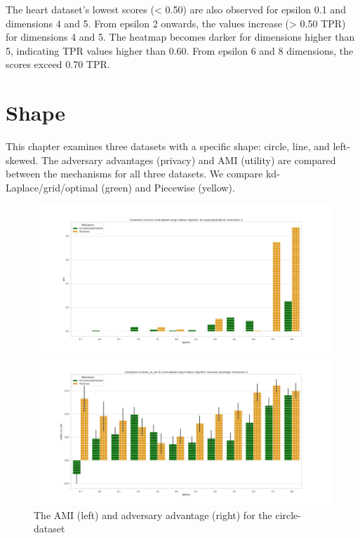 The heart dataset's lowest scores (< 0.50) are also observed for epsilon 0.1 and dimensions 4 and 5. From epsilon 2 onwards, the values increase (> 0.50 TPR) for dimensions 4 and 5. The heatmap becomes darker for dimensions higher than 5, indicating TPR values higher than 0.60. From epsilon 6 and 8 dimensions, the scores exceed 0.70 TPR.
\newpage

\section{Shape}
This chapter examines three datasets with a specific shape: circle, line, and left-skewed.
The adversary advantages (privacy) and AMI (utility) are compared between the mechanisms for all three datasets.
We compare kd-Laplace/grid/optimal (green) and Piecewise (yellow).
\begin{figure}[H]
    \begin{minipage}[c]{0.55\textwidth}
        \includegraphics[width=\textwidth]{Results/RQ3/circle-dataset/ami_circle-dataset_comparison.png}
    \end{minipage}
    \begin{minipage}[c]{0.55\textwidth}
        \includegraphics[width=\textwidth]{Results/RQ3/circle-dataset/shokri_mi_adv_circle-dataset_comparison.png}
    \end{minipage}
    \label{fig:advantage_circle-dataset_comparison}
    \caption{The AMI (left) and adversary advantage (right) for the circle-dataset}
\end{figure}

